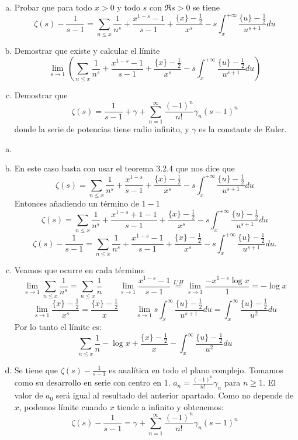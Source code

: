 \documentclass[twoside]{article}
\begin{document}
\newpage
\begin{ejercicio}{2}
\begin{enumerate}[(a)]
	\item Probar que para todo $x > 0$ y todo $s$ con $\Re s > 0$ se tiene
	\[ ζ(s) - \frac{1}{s-1} = \sum_{n≤x} \frac{1}{n^s} + \frac{x^{1-s}-1}{s-1} + \frac{\{x\}-\frac{1}{2}}{x^s} - s \int_x^{+∞} \frac{\{u\}-\frac{1}{2}}{u^{s+1}} du \]
	\item Demostrar que existe y calcular el límite
	\[ \lim_{s \to 1} \left(\sum_{n≤x} \frac{1}{n^s} + \frac{x^{1-s}-1}{s-1} + \frac{\{x\}-\frac{1}{2}}{x^s} - s \int_x^{+∞} \frac{\{u\}-\frac{1}{2}}{u^{s+1}} du\right) \]
	\item Demostrar que
	\[ ζ(s) = \frac{1}{s-1} + γ + \sum_{n=1}^{∞} \frac{(-1)^n}{n!} γ_n (s-1)^n \]
	donde la serie de potencias tiene radio infinito, y $γ$ es la constante de Euler.
\end{enumerate}
\end{ejercicio}
\begin{solucion}
\begin{enumerate}[(a)]
\item[]
\item En este caso basta con usar el teorema 3.2.4 que nos dice que 
$$\zeta(s)=\sum\limits_{n\leq x}\dfrac{1}{n^s}+\dfrac{x^{1-s}}{s-1}+\dfrac{\{x\}-\frac{1}{2}}{x^s}-s\int_x^{+\infty}\frac{\{u\}-\frac{1}{2}}{u^{s+1}}du$$
Entonces añadiendo un término de $1-1$
$$\zeta(s)=\sum\limits_{n\leq x}\dfrac{1}{n^s}+\dfrac{x^{1-s}+1-1}{s-1}+\dfrac{\{x\}-\frac{1}{2}}{x^s}-s\int_x^{+\infty}\frac{\{u\}-\frac{1}{2}}{u^{s+1}}du$$
$$\displaystyle{\zeta(s)-\frac{1}{s-1}=\sum\limits_{n\leq x}\frac{1}{n^s}+\frac{x^{1-s}-1}{s-1}+\frac{\{x\}-\frac{1}{2}}{x^s}-s\int_x^{+\infty}\frac{\{u\}-\frac{1}{2}}{u^{s+1}}du}.$$
	\item Veamos que ocurre en cada término:
	\[ \lim_{s \to 1} \sum_{n≤x} \frac{1}{n^s} = \sum_{n≤x} \frac{1}{n} 
	\qquad \lim_{s \to 1} \frac{x^{1-s}-1}{s-1} \stackrel{L'H}{=} \lim_{s \to 1} \frac{-x^{1-s}\log x}{1} = - \log x \]
	\[ \lim_{s \to 1} \frac{\{x\}-\frac{1}{2}}{x^s} = \frac{\{x\}-\frac{1}{2}}{x} \qquad \lim_{s \to 1} s \int_x^{∞} \frac{\{u\}-\frac{1}{2}}{u^{s+1}} du = \int_x^{∞} \frac{\{u\}-\frac{1}{2}}{u^2} du \]
	Por lo tanto el límite es:
	\[ \sum_{n≤x}\frac{1}{n} - \log x + \frac{\{x\}-\frac{1}{2}}{x} - \int_x^{∞} \frac{\{u\}-\frac{1}{2}}{u^2} du \]
	\item Se tiene que $ζ(s)-\frac{1}{s-1}$ es analítica en todo el plano complejo. Tomamos como su desarrollo en serie con centro en $1$. $a_n=\frac{(-1)^n}{n!} γ_n$ para $n ≥ 1$. El valor de $a_0$ será igual al resultado del anterior apartado. Como no depende de $x$, podemos límite cuando $x$ tiende a infinito y obtenemos:
	\[ ζ(s) - \frac{1}{s-1} = γ + \sum_{n=1}^{∞} \frac{(-1)^n}{n!} γ_n (s-1)^n \]
\end{enumerate}
\end{solucion}
\newpage
\end{document}
